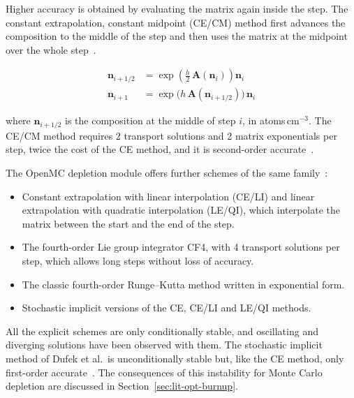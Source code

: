 Higher accuracy is obtained by evaluating the matrix again inside the
step. The constant extrapolation, constant midpoint (CE/CM) method first
advances the composition to the middle of the step and then uses the
matrix at the midpoint over the whole step~\cite{romano_2021_depletion}.

\begin{equation}
\begin{aligned}
\mathbf{n}_{i+1/2} &= \exp\!\left(\tfrac{h}{2}\,\mathbf{A}(\mathbf{n}_i)\right)\mathbf{n}_i \\
\mathbf{n}_{i+1} &= \exp\!\big(h\,\mathbf{A}(\mathbf{n}_{i+1/2})\big)\,\mathbf{n}_i
\end{aligned}
\label{eq:dep-cecm}
\end{equation}

\noindent where $\mathbf{n}_{i+1/2}$ is the composition at the middle of
step $i$, in atoms\,cm$^{-3}$. The CE/CM method requires 2 transport solutions and 2 matrix exponentials per step, twice the cost of the CE
method, and it is second-order accurate~\cite{romano_2021_depletion}.

The OpenMC depletion module offers further schemes of the same
family~\cite{romano_2021_depletion}:

\begin{itemize}
  \item Constant extrapolation with linear interpolation (CE/LI) and
        linear extrapolation with quadratic interpolation (LE/QI), which
        interpolate the matrix between the start and the end of the
        step.

  \item The fourth-order Lie group integrator CF4, with 4 transport
        solutions per step, which allows long steps without loss of
        accuracy.

  \item The classic fourth-order Runge--Kutta method written in
        exponential form.

  \item Stochastic implicit versions of the CE, CE/LI and LE/QI methods.
\end{itemize}

All the explicit schemes are only conditionally stable, and oscillating
and diverging solutions have been observed with them. The stochastic
implicit method of Dufek et al.\ is unconditionally stable but, like the
CE method, only first-order accurate~\cite{romano_2021_depletion}. The
consequences of this instability for Monte Carlo depletion are discussed
in Section~\ref{sec:lit-opt-burnup}.

